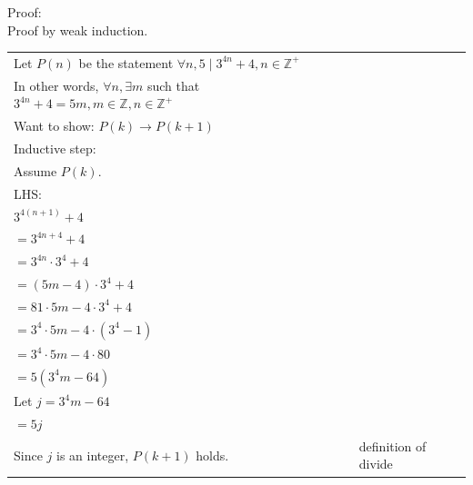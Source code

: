 \documentclass[12pt]{exam}
\begin{document}
\begin{solution}
	Proof:\\
	Proof by weak induction.\\
	\begin{tabular}{ll}
		Let $P(n)$ be the statement $\forall n, 5\mid 3^{4n}+4, n\in \mathbb{Z}^+$                         \\
		In other words, $\forall n, \exists m$ such that $3^{4n}+4=5m, m\in \mathbb{Z}, n\in \mathbb{Z}^+$ \\
		Want to show: $P(k)\rightarrow P(k+1)$                                                             \\
		Inductive step:                                                                                    \\
		Assume $P(k)$.                                                                                     \\
		LHS:                                                                                               \\
		$3^{4(n+1)}+4$                                                                                     \\
		$=3^{4n+4}+4$                                                                                      \\
		$=3^{4n}\cdot 3^4+4$                                                                               \\
		$=(5m-4)\cdot 3^4+4$                                                                               \\
		$=81\cdot 5m-4\cdot 3^4+4$                                                                         \\
		$=3^4\cdot 5m -4\cdot (3^4-1)$                                                                     \\
		$=3^4\cdot 5m -4\cdot 80$                                                                          \\
		$=5(3^4m-64)$                                                                                      \\
		Let  $j=3^4m-64$                                                                                   \\
		$=5j$                                                                                              \\
		Since $j$ is an integer, $P(k+1)$ holds.      & definition of divide                               \\



\end{tabular}
\end{solution}
\end{document}
